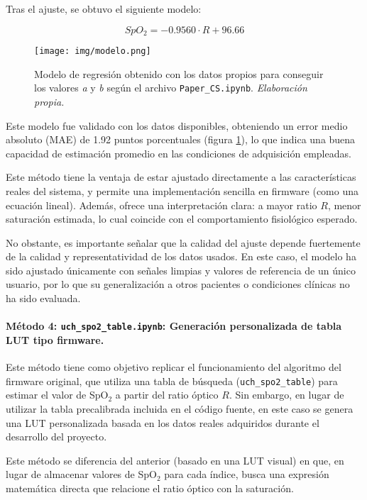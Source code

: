 Tras el ajuste, se obtuvo el siguiente modelo:

\begin{equation}
SpO_2 = -0.9560 \cdot R + 96.66
\end{equation}

\begin{figure}[H]
    \centering
    \texttt{[image: img/modelo.png]}
    \caption{Modelo de regresión obtenido con los datos propios para conseguir los valores \textit{a} y \textit{b} según el archivo \texttt{Paper\_CS.ipynb}. \textit{Elaboración propia.}}
    \label{fig:modelo}
\end{figure}

Este modelo fue validado con los datos disponibles, obteniendo un error medio absoluto (MAE) de 1.92 puntos porcentuales (figura \ref{fig:modelo}), lo que indica una buena capacidad de estimación promedio en las condiciones de adquisición empleadas.


Este método tiene la ventaja de estar ajustado directamente a las características reales del sistema, y permite una implementación sencilla en firmware (como una ecuación lineal). Además, ofrece una interpretación clara: a mayor ratio \( R \), menor saturación estimada, lo cual coincide con el comportamiento fisiológico esperado.

No obstante, es importante señalar que la calidad del ajuste depende fuertemente de la calidad y representatividad de los datos usados. En este caso, el modelo ha sido ajustado únicamente con señales limpias y valores de referencia de un único usuario, por lo que su generalización a otros pacientes o condiciones clínicas no ha sido evaluada.

\paragraph{Método 4: \texttt{uch\_spo2\_table.ipynb}: Generación personalizada de tabla LUT tipo firmware.}

Este método tiene como objetivo replicar el funcionamiento del algoritmo del firmware original, que utiliza una tabla de búsqueda (\texttt{uch\_spo2\_table}) para estimar el valor de SpO$_2$ a partir del ratio óptico \( R \). Sin embargo, en lugar de utilizar la tabla precalibrada incluida en el código fuente, en este caso se genera una LUT personalizada basada en los datos reales adquiridos durante el desarrollo del proyecto.

Este método se diferencia del anterior (basado en una LUT visual) en que, en lugar de almacenar valores de SpO$_2$ para cada índice, busca una expresión matemática directa que relacione el ratio óptico con la saturación.


